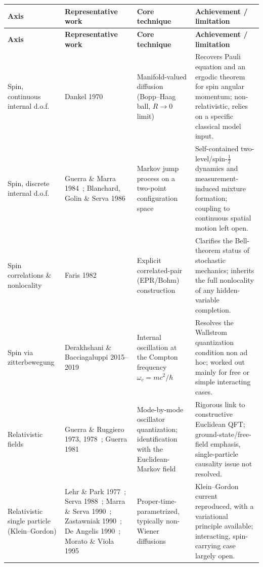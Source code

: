 \documentclass[11pt]{article}
\begin{document}
\begingroup
\small
\begin{longtable}{@{}p{2.6cm}p{3.3cm}p{4.0cm}p{4.7cm}@{}}
\toprule
\textbf{Axis} & \textbf{Representative work} & \textbf{Core technique} & \textbf{Achievement / limitation} \\
\midrule
\endfirsthead
\toprule
\textbf{Axis} & \textbf{Representative work} & \textbf{Core technique} & \textbf{Achievement / limitation} \\
\midrule
\endhead
Spin, continuous internal d.o.f.\ &
Dankel 1970~\cite{dankel70} &
Manifold-valued diffusion (Bopp--Haag ball, $R\to0$ limit) &
Recovers Pauli equation and an ergodic theorem for spin angular momentum; non-relativistic, relies on a specific classical model input. \\[4pt]
Spin, discrete internal d.o.f.\ &
Guerra \& Marra 1984~\cite{guerramarra84}; Blanchard, Golin \& Serva 1986~\cite{blanchardgolinserva86} &
Markov jump process on a two-point configuration space &
Self-contained two-level/spin-$\tfrac12$ dynamics and measurement-induced mixture formation; coupling to continuous spatial motion left open. \\[4pt]
Spin correlations \& nonlocality &
Faris 1982~\cite{faris82} &
Explicit correlated-pair (EPR/Bohm) construction &
Clarifies the Bell-theorem status of stochastic mechanics; inherits the full nonlocality of any hidden-variable completion. \\[4pt]
Spin via zitterbewegung &
Derakhshani \& Bacciagaluppi 2015--2019~\cite{derakhshani15,derakhshani16} &
Internal oscillation at the Compton frequency $\omega_c=mc^2/\hbar$ &
Resolves the Wallstrom quantization condition non ad hoc; worked out mainly for free or simple interacting cases. \\[4pt]
Relativistic fields &
Guerra \& Ruggiero 1973, 1978~\cite{guerraruggiero73,guerraruggiero78}; Guerra 1981~\cite{guerra81} &
Mode-by-mode oscillator quantization; identification with the Euclidean-Markov field &
Rigorous link to constructive Euclidean QFT; ground-state/free-field emphasis, single-particle causality issue not resolved. \\[4pt]
Relativistic single particle (Klein--Gordon) &
Lehr \& Park 1977~\cite{lehrpark77}; Serva 1988~\cite{serva88}; Marra \& Serva 1990~\cite{marraserva90}; Zastawniak 1990~\cite{zastawniak90}; De Angelis 1990~\cite{deangelis90}; Morato \& Viola 1995~\cite{moratoviola95} &
Proper-time-parametrized, typically non-Wiener diffusions &
Klein--Gordon current reproduced, with a variational principle available; interacting, spin-carrying case largely open. \\[4pt]

\end{longtable}
\end{document}
